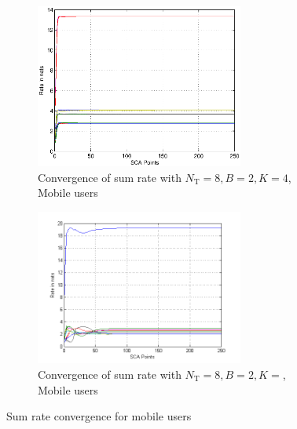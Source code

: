 \documentclass[a4paper, 12pt,titlepage]{dithesis} %
\begin{document}
\begin{figure}
	\centering
	\begin{subfigure}[b]{0.75\textwidth}
		\centering
		\includegraphics[width=0.75\textwidth]{kktmserc8142}
		\caption{Convergence of sum rate with $N_\mathrm{T} = 8, B = 2, K = 4$, Mobile users}
		\label{fig_1}
	\end{subfigure}
	\begin{subfigure}[b]{0.75\textwidth}
		\centering
		\includegraphics[width=0.75\textwidth]{kktmserc8182}
		\caption{Convergence of sum rate with $N_\mathrm{T} = 8, B = 2, K = $, Mobile users}
		\label{fig-2}
	\end{subfigure}
	\caption{Sum rate convergence for mobile users}
	\label{figIII}
\end{figure}

\end{document}
